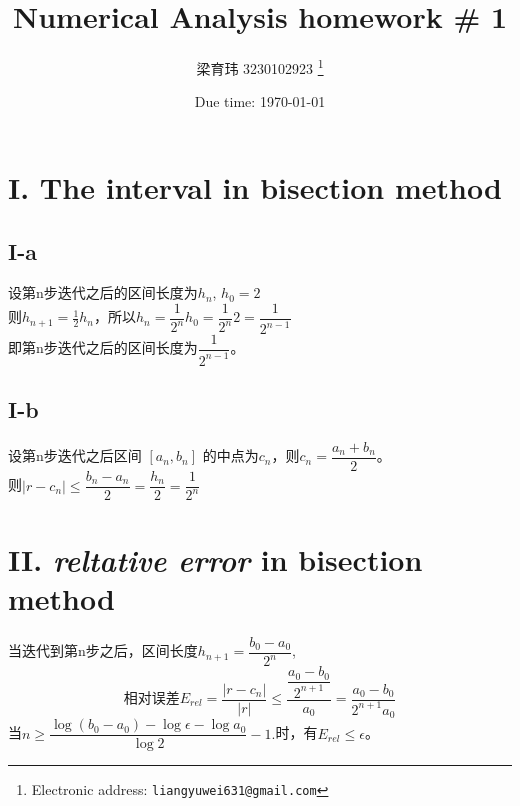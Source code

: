 \documentclass[a4paper]{article}
\begin{document}
\title{Numerical Analysis homework \# 1}

\author{梁育玮 3230102923
  \thanks{Electronic address: \texttt{liangyuwei631@gmail.com}}}


\date{Due time: \today}

\maketitle



\section*{I. The interval in bisection method}

\subsection*{I-a}

设第n步迭代之后的区间长度为$h_n$, $h_0 = 2$\\
\hspace*{2em}则$h_{n+1} = \frac{1}{2}h_n$，所以$h_n = \dfrac{1}{2^n}h_0 = \dfrac{1}{2^n}2 = \dfrac{1}{2^{n-1}}$
\\\hspace*{2em}即第n步迭代之后的区间长度为$\dfrac{1}{2^{n-1}}$。
\subsection*{I-b}
设第n步迭代之后区间 $[a_n, b_n]$ 的中点为$c_n$，则$c_n = \dfrac{a_n + b_n}{2}$。\\
\hspace*{2em}则$ |r - c_n| \leq \dfrac{b_n - a_n}{2} = \dfrac{h_n}{2} = \dfrac{1}{2^{n}}$

\section*{II. \emph{reltative error} in bisection method}
当迭代到第n步之后，区间长度$h_{n+1} = \dfrac{b_0 - a_0}{2^n}$,
\[相对误差E_{rel} = \dfrac{|r - c_n|}{|r|} \leq \dfrac{\dfrac{a_0 - b_0}{2^{n+1}}}{a_0} =  \dfrac{a_0 - b_0}{2^{n+1} a_0}
\]
\hspace*{2em}当$
n \geq \dfrac{\log(b_0 - a_0) - \log \epsilon - \log a_0}{\log 2} - 1.
$时，有$E_{rel} \leq \epsilon$。
\end{document}
